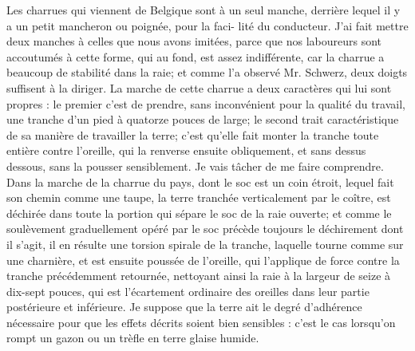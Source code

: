 Les charrues qui viennent de Belgique sont à un seul manche, derrière lequel il y a un petit mancheron ou poignée, pour la faci-\setcounter{page}{364} lité du conducteur. J'ai fait mettre deux manches à celles que nous avons imitées, parce que nos laboureurs sont accoutumés à cette forme, qui au fond, est assez indifférente, car la charrue a beaucoup de stabilité dans la raie; et comme l'a observé Mr. Schwerz, deux doigts suffisent à la diriger.
La marche de cette charrue a deux caractères qui lui sont propres : le premier c'est de prendre, sans inconvénient pour la qualité du travail, une tranche d'un pied à quatorze pouces de large; le second trait caractéristique de sa manière de travailler la terre; c'est qu'elle fait monter la tranche toute entière contre l'oreille, qui la renverse ensuite obliquement, et sans dessus dessous, sans la pousser sensiblement. Je vais tâcher de me faire comprendre.
Dans la marche de la charrue du pays, dont le soc est un coin étroit, lequel fait son chemin comme une taupe, la terre tranchée verticalement par le coître, est déchirée dans toute la portion qui sépare le soc de la raie ouverte; et comme le soulèvement graduellement opéré par le soc précède toujours le déchirement dont il s'agit, il en résulte une torsion spirale de la tranche, laquelle tourne comme sur une\setcounter{page}{365} charnière, et est ensuite poussée de l'oreille, qui l'applique de force contre la tranche précédemment retournée, nettoyant ainsi la raie à la largeur de seize à dix-sept pouces, qui est l'écartement ordinaire des oreilles dans leur partie postérieure et inférieure. Je suppose que la terre ait le degré d'adhérence nécessaire pour que les effets décrits soient bien sensibles : c'est le cas lorsqu'on rompt un gazon ou un trèfle en terre glaise humide.
